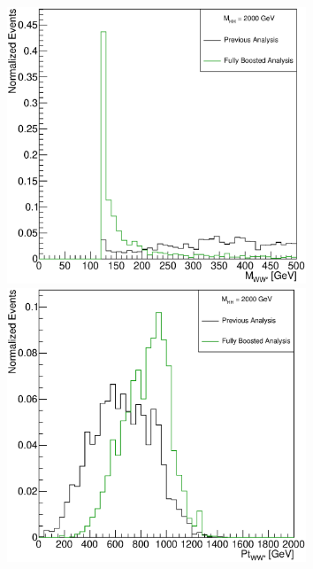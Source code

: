 \documentclass{beamer}
\newcommand*{\header}[1]{\fontsize{16}{8}\selectfont \textbf{{\color{MyPurple}{#1}}}}
\begin{document}
\begin{frame}
\begin{center}
\header{Reconstructed Variables e-Channel}
\end{center}
\vspace{-0.5cm}
\begin{columns}
\begin{column}{0.5\textwidth}
\begin{center}
\includegraphics[width=0.7\textwidth]{figures/WHad_plots_john_withcuts/electron/hww_m_Xhh2000}\\
\includegraphics[width=0.7\textwidth]{figures/WHad_plots_john_withcuts/electron/hww_pt_Xhh2000}
\end{center}
\end{column}
\begin{column}{0.5\textwidth}
\begin{center}

\end{center}
\end{column}
\end{columns}
\end{frame}
\end{document}
